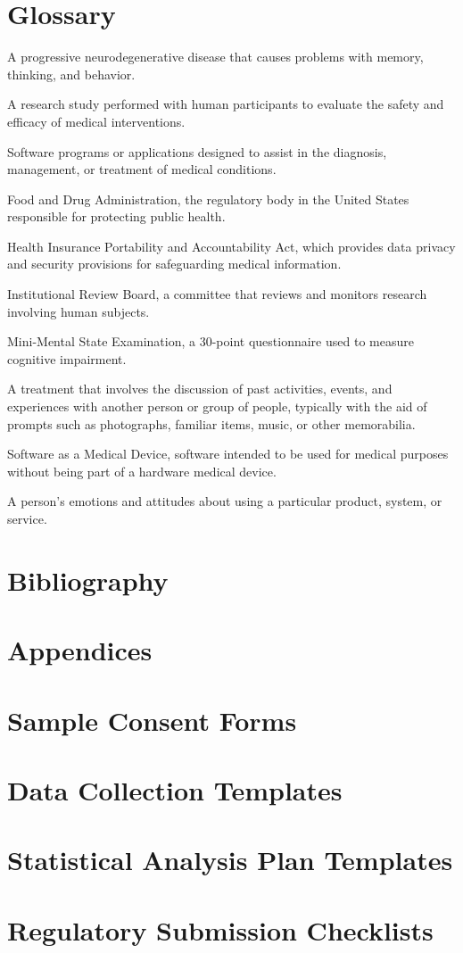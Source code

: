 \documentclass[12pt,a4paper]{book}
\begin{document}
\chapter{Glossary}
\begin{description}[style=nextline]
\item[Alzheimer's Disease (AD)] A progressive neurodegenerative disease that causes problems with memory, thinking, and behavior.
\item[Clinical Trial] A research study performed with human participants to evaluate the safety and efficacy of medical interventions.
\item[Digital Health Application] Software programs or applications designed to assist in the diagnosis, management, or treatment of medical conditions.
\item[FDA] Food and Drug Administration, the regulatory body in the United States responsible for protecting public health.
\item[HIPAA] Health Insurance Portability and Accountability Act, which provides data privacy and security provisions for safeguarding medical information.
\item[IRB] Institutional Review Board, a committee that reviews and monitors research involving human subjects.
\item[MMSE] Mini-Mental State Examination, a 30-point questionnaire used to measure cognitive impairment.
\item[Reminiscence Therapy] A treatment that involves the discussion of past activities, events, and experiences with another person or group of people, typically with the aid of prompts such as photographs, familiar items, music, or other memorabilia.
\item[SaMD] Software as a Medical Device, software intended to be used for medical purposes without being part of a hardware medical device.
\item[User Experience (UX)] A person's emotions and attitudes about using a particular product, system, or service.
\end{description}

\chapter{Bibliography}
\printbibliography[heading=none]

\chapter{Appendices}
\begin{appendices}
\chapter{Sample Consent Forms}
\chapter{Data Collection Templates}
\chapter{Statistical Analysis Plan Templates}
\chapter{Regulatory Submission Checklists}
\end{appendices}
\end{document}
